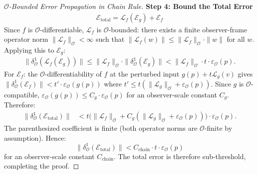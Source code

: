 \begin{proof}[$\mathcal{O}$-Bounded Error Propagation in Chain Rule]
\textbf{Step 4: Bound the Total Error}
\begin{align}
\mathcal{E}_{\text{total}} = \mathcal{L}_f(\mathcal{E}_g) + \mathcal{E}_f
\end{align}
Since $f$ is $\mathcal{O}$-differentiable, $\mathcal{L}_f$ is $\mathcal{O}$-bounded: there exists a finite observer-frame operator norm $\|\mathcal{L}_f\|_{\mathcal{O}} < \infty$ such that $\|\mathcal{L}_f(w)\| \leq \|\mathcal{L}_f\|_{\mathcal{O}} \cdot \|w\|$ for all $w$. Applying this to $\mathcal{E}_g$:
\begin{align}
\|\delta^1_{\mathcal{O}}(\mathcal{L}_f(\mathcal{E}_g))\| \leq \|\mathcal{L}_f\|_{\mathcal{O}} \cdot \|\delta^1_{\mathcal{O}}(\mathcal{E}_g)\| < \|\mathcal{L}_f\|_{\mathcal{O}} \cdot t \cdot \varepsilon_{\mathcal{O}}(p).
\end{align}
For $\mathcal{E}_f$: the $\mathcal{O}$-differentiability of $f$ at the perturbed input $g(p) + t\mathcal{L}_g(v)$ gives $\|\delta^1_{\mathcal{O}}(\mathcal{E}_f)\| < t' \cdot \varepsilon_{\mathcal{O}}(g(p))$ where $t' \leq t(\|\mathcal{L}_g\|_{\mathcal{O}} + \varepsilon_{\mathcal{O}}(p))$. Since $g$ is $\mathcal{O}$-compatible, $\varepsilon_{\mathcal{O}}(g(p)) \leq C_g \cdot \varepsilon_{\mathcal{O}}(p)$ for an observer-scale constant $C_g$. Therefore:
\begin{align}
\|\delta^1_{\mathcal{O}}(\mathcal{E}_{\text{total}})\|
&< t \bigl(\|\mathcal{L}_f\|_{\mathcal{O}}
+ C_g(\|\mathcal{L}_g\|_{\mathcal{O}} + \varepsilon_{\mathcal{O}}(p))\bigr)
\cdot \varepsilon_{\mathcal{O}}(p).
\end{align}
The parenthesized coefficient is finite (both operator norms are
$\mathcal{O}$-finite by assumption). Hence:
\[
\|\delta^1_{\mathcal{O}}(\mathcal{E}_{\text{total}})\|
< C_{\text{chain}} \cdot t \cdot \varepsilon_{\mathcal{O}}(p)
\]
for an observer-scale constant $C_{\text{chain}}$. The total error is therefore
sub-threshold, completing the proof.
\end{proof}

